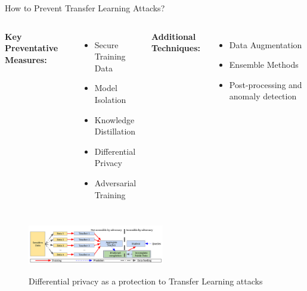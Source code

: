 \begin{frame}{How to Prevent Transfer Learning Attacks?}
    \begin{columns}
        \textbf{Key Preventative Measures:}
        \begin{itemize}
            \item Secure Training Data
            \item Model Isolation
            \item Knowledge Distillation
            \item Differential Privacy
            \item Adversarial Training
        \end{itemize}
    
        \textbf{Additional Techniques:}
        \begin{itemize}
            \item Data Augmentation
            \item Ensemble Methods
            \item Post-processing and anomaly detection
        \end{itemize}
    \end{columns}
    \begin{figure}[h]
        \centering
        \includegraphics[width=0.53\textwidth]{img/how-to-prevent.png}
        \label{fig:how-to-prevent}
        \caption{Differential privacy as a protection to Transfer Learning attacks}
    \end{figure}
\end{frame}





